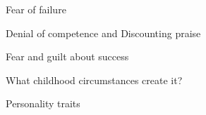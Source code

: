 \documentclass[aspectratio=169]{beamer}
\begin{document}
\begin{frame}
  \begin{center}
    \Huge Fear of failure
    \\ \small \cite{sakulku11}
  \end{center}
\end{frame}

\begin{frame}
  \begin{center}
    \Huge Denial of competence and Discounting praise
    \\ \small \cite{sakulku11}
  \end{center}
\end{frame}

\begin{frame}
  \begin{center}
    \Huge Fear and guilt about success
    \\ \small \cite{sakulku11}
  \end{center}
\end{frame}


\begin{frame}
  \begin{center}
    \Huge What childhood circumstances create it?
    \\ \small \cite{sakulku11}
  \end{center}
\end{frame}

\begin{frame}
  \begin{center}
    \Huge Personality traits
    \\ \small \cite{hh15}
    \\ \small \cite{sakulku11}
  \end{center}
\end{frame}
\end{document}
